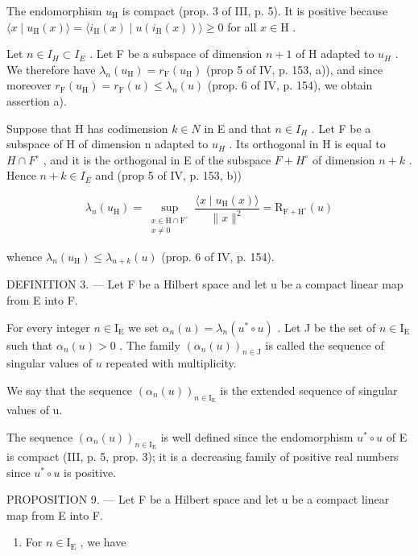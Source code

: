 The endomorphism \(u_{\mathrm{H}}\) is compact (prop. 3 of III, p. 5). It is positive because \(\langle x \mid u_{\mathrm{H}}(x) \rangle = \langle i_{\mathrm{H}}(x) \mid u(i_{\mathrm{H}}(x)) \rangle \geqslant 0\) for all \(x \in \mathrm{H}\) .

Let \(n \in I_{H} \subset I_{E}\) . Let F be a subspace of dimension \(n + 1\) of H adapted to \(u_{H}\) . We therefore have \(\lambda_{n}(u_{\mathrm{H}}) = r_{\mathrm{F}}(u_{\mathrm{H}})\) (prop 5 of IV, p. 153, a)), and since moreover \(r_{\mathrm{F}}(u_{\mathrm{H}}) = r_{\mathrm{F}}(u) \leqslant \lambda_{n}(u)\) (prop. 6 of IV, p. 154), we obtain assertion a).

Suppose that H has codimension \(k \in N\) in E and that \(n \in I_{H}\) . Let F be a subspace of H of dimension n adapted to \(u_{H}\) . Its orthogonal in H is equal to \(H \cap F^{\circ}\) , and it is the orthogonal in E of the subspace \(F + H^{\circ}\) of dimension \(n + k\) . Hence \(n + k \in I_{E}\) and (prop 5 of IV, p. 153, b))

\[
\lambda_{n}(u_{\mathrm{H}}) = \sup_{\substack{x\in \mathrm{H}\cap \mathrm{F}^{\circ}\\ x\neq 0}}\frac{\langle x\mid u_{\mathrm{H}}(x)\rangle}{\|x\|^{2}} = \mathrm{R}_{\mathrm{F} + \mathrm{H}^{\circ}}(u)
\]

whence \(\lambda_{n}(u_{\mathrm{H}})\leqslant \lambda_{n + k}(u)\) (prop. 6 of IV, p. 154).

DEFINITION 3. --- Let F be a Hilbert space and let u be a compact linear map from E into F.

For every integer \(n \in \mathrm{I}_{\mathrm{E}}\) we set \(\alpha_{n}(u) = \lambda_{n}(u^{*} \circ u)\) . Let J be the set of \(n \in \mathrm{I}_{\mathrm{E}}\) such that \(\alpha_{n}(u) > 0\) . The family \((\alpha_{n}(u))_{n \in \mathrm{J}}\) is called the sequence of singular values of \(u\) repeated with multiplicity.

We say that the sequence \((\alpha_{n}(u))_{n\in\mathrm{I}_{\mathrm{E}}}\) is the extended sequence of singular values of u.

The sequence \((\alpha_{n}(u))_{n\in\mathrm{I}_{\mathrm{E}}}\) is well defined since the endomorphism \(u^{*}\circ u\) of E is compact (III, p. 5, prop. 3); it is a decreasing family of positive real numbers since \(u^{*}\circ u\) is positive.

PROPOSITION 9. --- Let F be a Hilbert space and let u be a compact linear map from E into F.

\begin{enumerate}
\def\labelenumi{\alph{enumi})}
\tightlist
\item
  For \(n \in \mathrm{I}_{\mathrm{E}}\) , we have
\end{enumerate}

